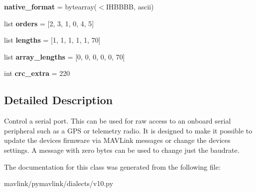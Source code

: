 \begin{DoxyCompactItemize}
\item 
\mbox{\label{classpymavlink_1_1dialects_1_1v10_1_1MAVLink__serial__control__message_a761aba03413be7909bcd6a4cc8f5ec26}} 
{\bfseries native\+\_\+format} = bytearray(\textquotesingle{}$<$I\+H\+B\+B\+BB\textquotesingle{}, \textquotesingle{}ascii\textquotesingle{})
\item 
\mbox{\label{classpymavlink_1_1dialects_1_1v10_1_1MAVLink__serial__control__message_a4371dfdbaa4b77986f94fef92ce9cac0}} 
list {\bfseries orders} = \mbox{[}2, 3, 1, 0, 4, 5\mbox{]}
\item 
\mbox{\label{classpymavlink_1_1dialects_1_1v10_1_1MAVLink__serial__control__message_aad70937c3d52363f6963adee489692c3}} 
list {\bfseries lengths} = \mbox{[}1, 1, 1, 1, 1, 70\mbox{]}
\item 
\mbox{\label{classpymavlink_1_1dialects_1_1v10_1_1MAVLink__serial__control__message_af544a080d89437a39cbd7a4c979824b4}} 
list {\bfseries array\+\_\+lengths} = \mbox{[}0, 0, 0, 0, 0, 70\mbox{]}
\item 
\mbox{\label{classpymavlink_1_1dialects_1_1v10_1_1MAVLink__serial__control__message_add67001af7676c211094a7497a86587d}} 
int {\bfseries crc\+\_\+extra} = 220
\end{DoxyCompactItemize}


\subsection{Detailed Description}
\begin{DoxyVerb}Control a serial port. This can be used for raw access to an
onboard serial peripheral such as a GPS or telemetry radio. It
is designed to make it possible to update the devices firmware
via MAVLink messages or change the devices settings. A message
with zero bytes can be used to change just the baudrate.
\end{DoxyVerb}
 

The documentation for this class was generated from the following file\+:\begin{DoxyCompactItemize}
\item 
mavlink/pymavlink/dialects/v10.\+py\end{DoxyCompactItemize}
